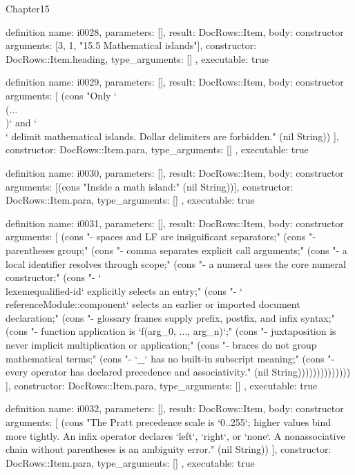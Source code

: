 \begin{lexlean}{Chapter15}
\begin{semanticmodule}
definition{
  name: i0028,
  parameters: [],
  result: DocRows::Item,
  body: constructor{
    arguments: [3, 1, "15.5 Mathematical islands"],
    constructor: DocRows::Item.heading,
    type_arguments: []
  },
  executable: true
}

definition{
  name: i0029,
  parameters: [],
  result: DocRows::Item,
  body: constructor{
    arguments: [
      (cons "Only `\\(...\\)` and `\\[...\\]` delimit mathematical islands. Dollar delimiters are forbidden." (nil String))
    ],
    constructor: DocRows::Item.para,
    type_arguments: []
  },
  executable: true
}

definition{
  name: i0030,
  parameters: [],
  result: DocRows::Item,
  body: constructor{
    arguments: [(cons "Inside a math island:" (nil String))],
    constructor: DocRows::Item.para,
    type_arguments: []
  },
  executable: true
}

definition{
  name: i0031,
  parameters: [],
  result: DocRows::Item,
  body: constructor{
    arguments: [
      (cons "- spaces and LF are insignificant separators;" (cons "- parentheses group;" (cons "- comma separates explicit call arguments;" (cons "- a local identifier resolves through scope;" (cons "- a numeral uses the core numeral constructor;" (cons "- `\\lexeme{qualified-id}` explicitly selects an entry;" (cons "- `\\reference{Module::component}` selects an earlier or imported document declaration;" (cons "- glossary frames supply prefix, postfix, and infix syntax;" (cons "- function application is `f(arg_0, ..., arg_n)`;" (cons "- juxtaposition is never implicit multiplication or application;" (cons "- braces do not group mathematical terms;" (cons "- `_` has no built-in subscript meaning;" (cons "- every operator has declared precedence and associativity." (nil String))))))))))))))
    ],
    constructor: DocRows::Item.para,
    type_arguments: []
  },
  executable: true
}

definition{
  name: i0032,
  parameters: [],
  result: DocRows::Item,
  body: constructor{
    arguments: [
      (cons "The Pratt precedence scale is `0..255`; higher values bind more tightly. An infix operator declares `left`, `right`, or `none`. A nonassociative chain without parentheses is an ambiguity error." (nil String))
    ],
    constructor: DocRows::Item.para,
    type_arguments: []
  },
  executable: true
}


\end{semanticmodule}
\end{lexlean}
